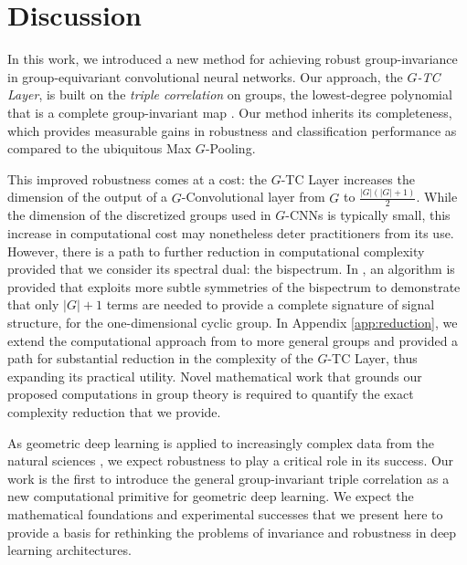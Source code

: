 \section{Discussion}
\vspace{-0.3cm}
In this work, we introduced a new method for achieving robust group-invariance in group-equivariant convolutional neural networks. Our approach, the \textit{$G$-TC Layer}, is built on the \textit{triple correlation} on groups, the lowest-degree polynomial that is a complete group-invariant map \cite{kakarala1992triple, sturmfels2008algorithms}. Our method inherits its completeness, which provides measurable gains in robustness and classification performance as compared to the ubiquitous Max $G$-Pooling.

This improved robustness comes at a cost: the $G$-TC Layer increases the dimension of the output of a $G$-Convolutional layer from $G$ to $\frac{|G|(|G|+1)}{2}$. While the dimension of the discretized groups used in $G$-CNNs is typically small, this increase in computational cost may nonetheless deter practitioners from its use. However, there is a path to further reduction in computational complexity provided that we consider its spectral dual: the bispectrum. In \cite{kondor2008thesis}, an algorithm is provided that exploits more subtle symmetries of the bispectrum to demonstrate that only $|G| + 1$ terms are needed to provide a complete signature of signal structure, for the one-dimensional cyclic group. In Appendix \ref{app:reduction}, we extend the computational approach from \cite{kondor2008thesis} to more general groups and provided a path for substantial reduction in the complexity of the $G$-TC Layer, thus expanding its practical utility. Novel mathematical work that grounds our proposed computations in group theory is required to quantify the exact complexity reduction that we provide.


As geometric deep learning is applied to increasingly complex data from the natural sciences \cite{gainza2020deciphering, atz2021geometric, ju2021performance}, we expect robustness to play a critical role in its success. Our work is the first to introduce the general group-invariant triple correlation as a new computational primitive for geometric deep learning. We expect the mathematical foundations and experimental successes that we present here to provide a basis for rethinking the problems of invariance and robustness in deep learning architectures.
